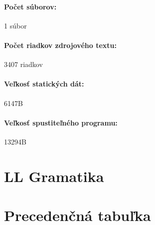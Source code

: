\documentclass[12pt,a4paper,titlepage,final]{article}
\begin{document}
\paragraph{Počet súborov:} 1 súbor
\paragraph{Počet riadkov zdrojového textu:} 3407 riadkov
\paragraph{Veľkosť statických dát:} 6147B
\paragraph{Veľkosť spustiteľného programu:} 13294B

%
\section{LL Gramatika} \label{gramatika}

%
\section{Precedenčná tabuľka} \label{precedencna_tabulka}
\end{document}
